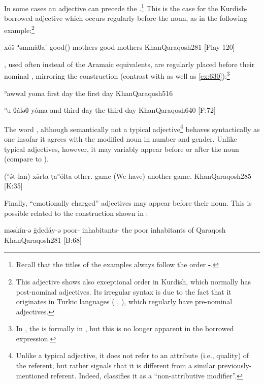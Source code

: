 \newpage 
In some cases an adjective can precede the \prim.\footnote{Recall that the titles of the examples  always follow the order \textbf{\Prim-\Secn}.} This is the case for the Kurdish-borrowed adjective  which occurs regularly before the noun, as in the following example:\footnote{This adjective shows also exceptional order in Kurdish, which normally has post-nominal adjectives. Its irregular syntax is due to the fact that it originates in Turkic languages ( ,  ), which regularly have pre-nominal adjectives.}

{xóš ʾəmmàθaˈ}
{good(\invar) mothers}
{good mothers}
{KhanQaraqosh}{281 {[Play 120]}}

 , used often instead of the Aramaic equivalents, are regularly placed before their nominal \prims, mirroring the  construction (contrast with  as well as \vref{ex:630}):\footnote{In , the  is formally in \cst*, but this is no longer apparent in the borrowed expression.}

{ʾawwal yoma}
{first day}
{the first day}
{KhanQaraqosh}{516}

{ʾu\cb{} θáləθ yóma}
{and\cb{} third day}
{the third day}
{KhanQaraqosh}{640 {[F:72]}}

The word , although semantically not a typical adjective\footnote{Unlike a typical adjective, it does not refer to an attribute (i.e., quality) of the referent, but rather signals that it is different from a similar previously-mentioned referent. Indeed,  \citet[285]{KhanQaraqosh} classifies it as a \enquote{non-attributive modifier}.} behaves syntactically as one insofar it agrees with the modified noun in number and gender. Unlike typical adjectives, however, it may variably appear before or after the noun (compare to ).

\largerpage
{}
{(ʾə́t-lan) xə́rta ṭaʿólta}
{\pl{} other.\fem{} game}
{(We have) another game.}
{KhanQaraqosh}{285 {[K:35]}}\antipar

\newpage
Finally, \enquote{emotionally charged} adjectives may appear before their noun. This is possible related to the  construction shown in :

{məskín-ə ġdedáy-ə}
{poor-\pl{} inhabitants-\pl}
{the poor inhabitants of Qaraqosh}
{KhanQaraqosh}{281 {[B:68]}}

